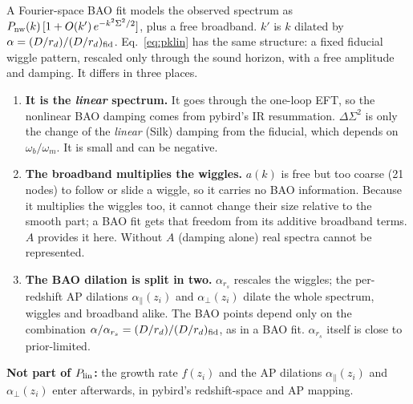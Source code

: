 \documentclass[11pt]{article}
\begin{document}
A Fourier-space BAO fit models the observed spectrum as $P_{\rm nw}(k)\,[1+O(k')\,e^{-k^2\Sigma^2/2}]$, plus a free
broadband. $k'$ is $k$ dilated by $\alpha=(D/r_d)/(D/r_d)_{\rm fid}$. Eq.~\eqref{eq:pklin} has the same structure: a
fixed fiducial wiggle pattern, rescaled only through the sound horizon, with a free amplitude and damping. It differs in
three places.
\begin{enumerate}\itemsep2pt
\item \textbf{It is the \emph{linear} spectrum.} It goes through the one-loop EFT, so the nonlinear BAO damping comes from
  pybird's IR resummation. $\Delta\Sigma^2$ is only the change of the \emph{linear} (Silk) damping from the fiducial, which
  depends on $\omega_b/\omega_m$. It is small and can be negative.
\item \textbf{The broadband multiplies the wiggles.} $a(k)$ is free but too coarse (21 nodes) to follow or slide a wiggle,
  so it carries no BAO information. Because it multiplies the wiggles too, it cannot change their size relative to the
  smooth part; a BAO fit gets that freedom from its additive broadband terms. $A$ provides it here. Without $A$ (damping
  alone) real spectra cannot be represented.
\item \textbf{The BAO dilation is split in two.} $\alpha_{r_s}$ rescales the wiggles; the per-redshift AP dilations
  $\alpha_\parallel(z_i)$ and $\alpha_\perp(z_i)$ dilate the whole spectrum, wiggles and broadband alike. The BAO points
  depend only on the combination $\alpha/\alpha_{r_s}=(D/r_d)/(D/r_d)_{\rm fid}$, as in a BAO fit. $\alpha_{r_s}$ itself is
  close to prior-limited.
\end{enumerate}

\textbf{Not part of $P_{\rm lin}$:} the growth rate $f(z_i)$ and the AP dilations $\alpha_\parallel(z_i)$ and
$\alpha_\perp(z_i)$ enter afterwards, in pybird's redshift-space and AP mapping.
\end{document}
